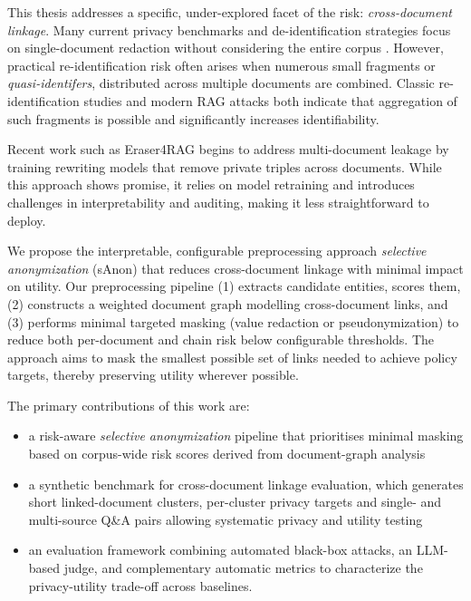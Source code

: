 This thesis addresses a specific, under-explored facet of the risk: \textit{cross-document linkage}. Many current privacy benchmarks and de-identification strategies focus on single-document redaction without considering the entire corpus \cite{ragSAGE,DPVoteRAG,LPRAG}. However, practical re-identification risk often arises when numerous small fragments or \textit{quasi-identifers}, distributed across multiple documents are combined. Classic re-identification studies and modern RAG attacks both indicate that aggregation of such fragments is possible and significantly increases identifiability. \cite{simpleDemographic,netflixDeAnon,ragThief}

Recent work such as Eraser4RAG begins to address multi-document leakage by training rewriting models that remove private triples across documents. While this approach shows promise, it relies on model retraining and introduces challenges in interpretability and auditing, making it less straightforward to deploy. \cite{eraser4RAG}

We propose the interpretable, configurable preprocessing approach \textit{selective anonymization} (sAnon) that reduces cross-document linkage with minimal impact on utility. Our preprocessing pipeline (1) extracts candidate entities, scores them, (2) constructs a weighted document graph modelling cross-document links, and (3) performs minimal targeted masking (value redaction or pseudonymization) to reduce both per-document and chain risk below configurable thresholds. The approach aims to mask the smallest possible set of links needed to achieve policy targets, thereby preserving utility wherever possible.

The primary contributions of this work are:
\begin{itemize}
  \item a risk-aware \textit{selective anonymization} pipeline that prioritises minimal masking based on corpus-wide risk scores derived from document-graph analysis
  \item a synthetic benchmark for cross-document linkage evaluation, which generates short linked-document clusters, per-cluster privacy targets and single- and multi-source Q\&A pairs allowing systematic privacy and utility testing
  \item an evaluation framework combining automated black-box attacks, an LLM-based judge, and complementary automatic metrics to characterize the privacy-utility trade-off across baselines.
\end{itemize}


